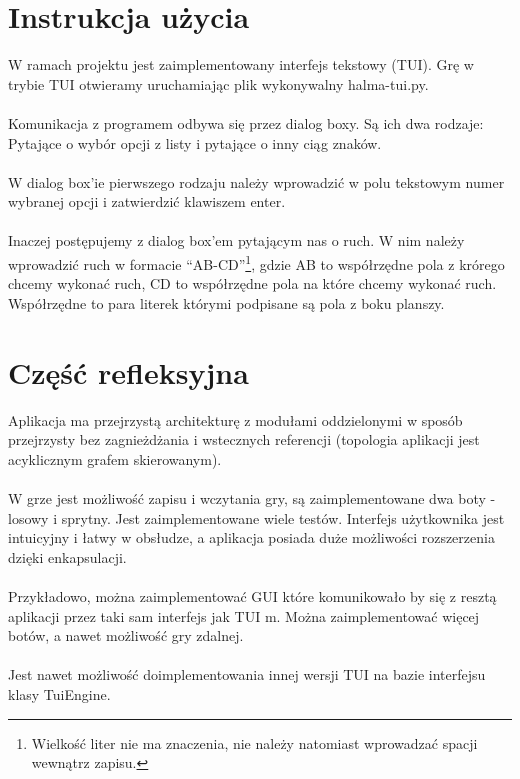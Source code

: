 \documentclass[12pt, titlepage]{article}
\begin{document}
\section{Instrukcja użycia}
W ramach projektu jest zaimplementowany interfejs tekstowy (TUI).
Grę w trybie TUI otwieramy uruchamiając plik wykonywalny
halma-tui.py.
\\~\\
Komunikacja z programem odbywa się przez dialog boxy.
Są ich dwa rodzaje: Pytające o wybór opcji z listy i
pytające o inny ciąg znaków.
\\~\\
W dialog box'ie pierwszego rodzaju należy wprowadzić w
polu tekstowym numer wybranej opcji i zatwierdzić
klawiszem enter.
\\~\\
Inaczej postępujemy z dialog box'em pytającym nas o ruch.
W nim należy wprowadzić ruch w formacie "`AB-CD"'\footnote{Wielkość liter nie ma znaczenia, nie należy natomiast wprowadzać spacji wewnątrz zapisu.}, gdzie AB
to współrzędne pola z krórego chcemy wykonać ruch, CD to
współrzędne pola na które chcemy wykonać ruch. Współrzędne
to para literek którymi podpisane są pola z boku planszy.

\section{Część refleksyjna}
Aplikacja ma przejrzystą architekturę z modułami
oddzielonymi w sposób przejrzysty bez zagnieżdżania
i wstecznych referencji (topologia aplikacji jest
acyklicznym grafem skierowanym).
\\~\\
W grze jest możliwość zapisu i wczytania gry, są zaimplementowane
dwa boty - losowy i sprytny. Jest zaimplementowane wiele testów.
Interfejs użytkownika jest intuicyjny i łatwy w obsłudze, a
aplikacja posiada duże możliwości rozszerzenia dzięki enkapsulacji.
\\~\\
Przykładowo, można zaimplementować GUI które komunikowało by
się z resztą aplikacji przez taki sam interfejs jak TUI m. Można
zaimplementować więcej botów, a nawet możliwość gry zdalnej.
\\~\\
Jest nawet możliwość doimplementowania innej wersji TUI na
bazie interfejsu klasy TuiEngine.
\end{document}
